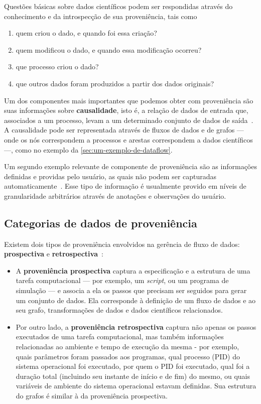 Questões básicas sobre dados científicos podem ser respondidas através do conhecimento e da introspecção de sua proveniência, tais como

\begin{enumerate}
    \item quem criou o dado, e quando foi essa criação?
    \item quem modificou o dado, e quando essa modificação ocorreu?
    \item que processo criou o dado?
    \item que outros dados foram produzidos a partir dos dados originais?
\end{enumerate}

Um dos componentes mais importantes que podemos obter com proveniência são suas informações sobre \textbf{causalidade}, isto é, a relação de dados de entrada que, associados a um processo, levam a um determinado conjunto de dados de saída~\cite{freire2008provenance}. A causalidade pode ser representada através de fluxos de dados e de grafos --- onde os nós correspondem a processos e arestas correspondem a dados científicos ---, como no exemplo da \autoref{sec:um-exemplo-de-dataflow}.

Um segundo exemplo relevante de componente de proveniência são as informações definidas e providas pelo usuário, as quais não podem ser capturadas automaticamente~\cite{freire2008provenance}. Esse tipo de informação é usualmente provido em níveis de granularidade arbitrários através de anotações e observações do usuário.

\subsection{Categorias de dados de proveniência}

Existem dois tipos de proveniência envolvidos na gerência de fluxo de dados: \textbf{prospectiva} e \textbf{retrospectiva}~\cite{murta2014noworkflow,freire2008provenance}:

\begin{itemize}
    \item A \textbf{proveniência prospectiva} captura a especificação e a estrutura de uma tarefa computacional --- por exemplo, um \textit{script}, ou um programa de simulação --- e associa a ela os passos que precisam ser seguidos para gerar um conjunto de dados. Ela corresponde à definição de um fluxo de dados e ao seu grafo, transformações de dados e dados científicos relacionados.
    \item Por outro lado, a \textbf{proveniência retrospectiva} captura não apenas os passos executados de uma tarefa computacional, mas também informações relacionadas ao ambiente e tempo de execução da mesma - por exemplo, quais parâmetros foram passados aos programas, qual  processo (PID) do sistema operacional foi executado, por quem o PID foi executado, qual foi a duração total (incluindo seu instante de início e de fim) do mesmo, ou quais variáveis de ambiente do sistema operacional estavam definidas. Sua estrutura do grafos é similar à da proveniência prospectiva.
\end{itemize}

